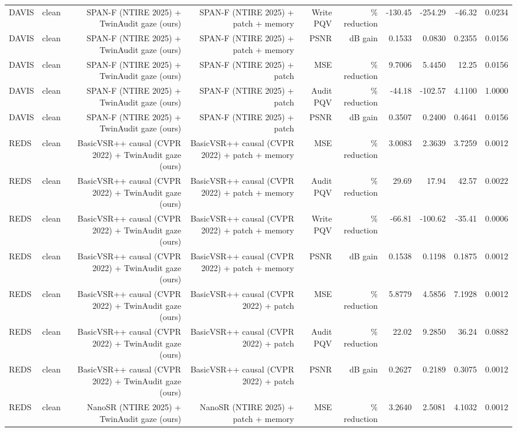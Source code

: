 \begin{table}[t]
\begin{tabular}{llrrrrrrrr}
DAVIS & clean & SPAN-F (NTIRE 2025) + TwinAudit gaze (ours) & SPAN-F (NTIRE 2025) + patch + memory & Write PQV & \% reduction & -130.45 & -254.29 & -46.32 & 0.0234 \\
DAVIS & clean & SPAN-F (NTIRE 2025) + TwinAudit gaze (ours) & SPAN-F (NTIRE 2025) + patch + memory & PSNR & dB gain & 0.1533 & 0.0830 & 0.2355 & 0.0156 \\
DAVIS & clean & SPAN-F (NTIRE 2025) + TwinAudit gaze (ours) & SPAN-F (NTIRE 2025) + patch & MSE & \% reduction & 9.7006 & 5.4450 & 12.25 & 0.0156 \\
DAVIS & clean & SPAN-F (NTIRE 2025) + TwinAudit gaze (ours) & SPAN-F (NTIRE 2025) + patch & Audit PQV & \% reduction & -44.18 & -102.57 & 4.1100 & 1.0000 \\
DAVIS & clean & SPAN-F (NTIRE 2025) + TwinAudit gaze (ours) & SPAN-F (NTIRE 2025) + patch & PSNR & dB gain & 0.3507 & 0.2400 & 0.4641 & 0.0156 \\
REDS & clean & BasicVSR++ causal (CVPR 2022) + TwinAudit gaze (ours) & BasicVSR++ causal (CVPR 2022) + patch + memory & MSE & \% reduction & 3.0083 & 2.3639 & 3.7259 & 0.0012 \\
REDS & clean & BasicVSR++ causal (CVPR 2022) + TwinAudit gaze (ours) & BasicVSR++ causal (CVPR 2022) + patch + memory & Audit PQV & \% reduction & 29.69 & 17.94 & 42.57 & 0.0022 \\
REDS & clean & BasicVSR++ causal (CVPR 2022) + TwinAudit gaze (ours) & BasicVSR++ causal (CVPR 2022) + patch + memory & Write PQV & \% reduction & -66.81 & -100.62 & -35.41 & 0.0006 \\
REDS & clean & BasicVSR++ causal (CVPR 2022) + TwinAudit gaze (ours) & BasicVSR++ causal (CVPR 2022) + patch + memory & PSNR & dB gain & 0.1538 & 0.1198 & 0.1875 & 0.0012 \\
REDS & clean & BasicVSR++ causal (CVPR 2022) + TwinAudit gaze (ours) & BasicVSR++ causal (CVPR 2022) + patch & MSE & \% reduction & 5.8779 & 4.5856 & 7.1928 & 0.0012 \\
REDS & clean & BasicVSR++ causal (CVPR 2022) + TwinAudit gaze (ours) & BasicVSR++ causal (CVPR 2022) + patch & Audit PQV & \% reduction & 22.02 & 9.2850 & 36.24 & 0.0882 \\
REDS & clean & BasicVSR++ causal (CVPR 2022) + TwinAudit gaze (ours) & BasicVSR++ causal (CVPR 2022) + patch & PSNR & dB gain & 0.2627 & 0.2189 & 0.3075 & 0.0012 \\
REDS & clean & NanoSR (NTIRE 2025) + TwinAudit gaze (ours) & NanoSR (NTIRE 2025) + patch + memory & MSE & \% reduction & 3.2640 & 2.5081 & 4.1032 & 0.0012 \\

\end{tabular}
\end{table}
